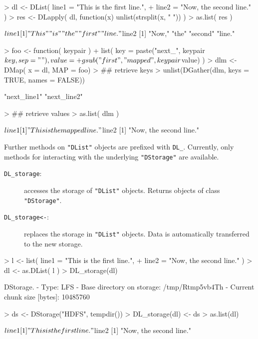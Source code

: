 \documentclass[fleqn]{article}
\let\code=\texttt
\newcommand{\class}[1]{\code{"#1"}}
\begin{document}
\begin{Schunk}
\begin{Sinput}
> dl <- DList( line1 = "This is the first line.",
+              line2 = "Now, the second line." )
> res <- DLapply( dl, function(x) unlist(strsplit(x, " ")) )
> as.list( res )
\end{Sinput}
\begin{Soutput}
$line1
[1] "This"  "is"    "the"   "first" "line."

$line2
[1] "Now,"   "the"    "second" "line." 
\end{Soutput}
\begin{Sinput}
> foo <- function( keypair )
+     list( key = paste("next_", keypair$key, sep = ""), value =
+          gsub("first", "mapped", keypair$value) )
> dlm <- DMap( x = dl, MAP = foo)
> ## retrieve keys
> unlist(DGather(dlm, keys = TRUE, names = FALSE))
\end{Sinput}
\begin{Soutput}
[1] "next_line1" "next_line2"
\end{Soutput}
\begin{Sinput}
> ## retrieve values
> as.list( dlm )
\end{Sinput}
\begin{Soutput}
$line1
[1] "This is the mapped line."

$line2
[1] "Now, the second line."
\end{Soutput}
\end{Schunk}

Further methods on \class{DList} objects are prefixed with
\code{DL\_}. Currently, only methods for interacting with
the underlying \class{DStorage}  are available.

\begin{description}
\item[\code{DL\_storage}:] accesses the storage of \class{DList}
  objects. Returns objects of class \class{DStorage}.
\item[\code{DL\_storage<-}:] replaces the storage  in \class{DList}
  objects. Data is automatically transferred to the new storage.
\end{description}

\begin{Schunk}
\begin{Sinput}
> l <- list( line1 = "This is the first line.",
+            line2 = "Now, the second line." )
> dl <- as.DList( l )
> DL_storage(dl)
\end{Sinput}
\begin{Soutput}
DStorage.
- Type: LFS
- Base directory on storage: /tmp/Rtmp5vb4Th
- Current chunk size [bytes]: 10485760
\end{Soutput}
\begin{Sinput}
> ds <- DStorage("HDFS", tempdir())
> DL_storage(dl) <- ds
> as.list(dl)
\end{Sinput}
\begin{Soutput}
$line1
[1] "This is the first line."

$line2
[1] "Now, the second line."
\end{Soutput}
\end{Schunk}
\end{document}
